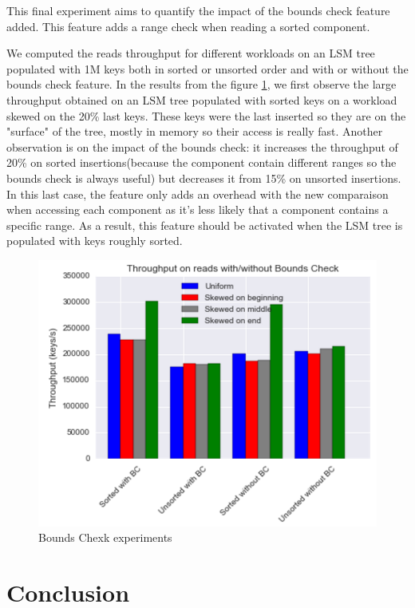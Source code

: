 \documentclass{sig-alternate-05-2015}
\begin{document}
This final experiment aims to quantify the impact of the bounds check feature added. This feature adds a range check when reading a sorted component. 

We computed the reads throughput for different workloads on an LSM tree populated with 1M keys both in sorted or unsorted order and with or without the bounds check feature. In the results from the figure \ref{ref:bounds}, we first observe the large throughput obtained on an LSM tree populated with sorted keys on a workload skewed on the 20\% last keys. These keys were the last inserted so they are on the "surface" of the tree, mostly in memory so their access is really fast. Another observation is on the impact of the bounds check: it increases the throughput of 20\% on sorted insertions(because the component contain different ranges so the bounds check is always useful) but decreases it from 15\% on unsorted insertions. In this last case, the feature only adds an overhead with the new comparaison when accessing each component as it's less likely that a component contains a specific range. As a result, this feature should be activated when the LSM tree is populated with keys roughly sorted.

\begin{figure}
\centering
\includegraphics[scale=0.45]{bounds_reads}
\caption{Bounds Chexk experiments}
\label{ref:bounds}
\end{figure}

\section{Conclusion}
\end{document}
